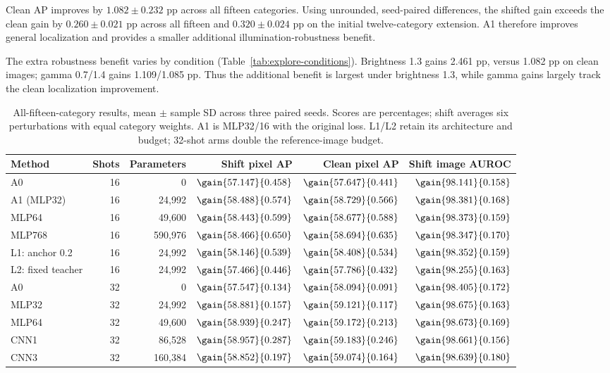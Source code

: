 Clean AP improves by $1.082\pm0.232$ pp across all fifteen categories. Using unrounded, seed-paired differences, the shifted gain exceeds the clean gain by $0.260\pm0.021$ pp across all fifteen and $0.320\pm0.024$ pp on the initial twelve-category extension. A1 therefore improves general localization and provides a smaller additional illumination-robustness benefit.

The extra robustness benefit varies by condition (Table~\ref{tab:explore-conditions}). Brightness 1.3 gains 2.461 pp, versus 1.082 pp on clean images; gamma 0.7/1.4 gains 1.109/1.085 pp. Thus the additional benefit is largest under brightness 1.3, while gamma gains largely track the clean localization improvement.

\begin{table}[t]
\centering
\caption{All-fifteen-category results, mean $\pm$ sample SD across three paired seeds. Scores are percentages; shift averages six perturbations with equal category weights. A1 is MLP32/16 with the original loss. L1/L2 retain its architecture and budget; 32-shot arms double the reference-image budget.}
\label{tab:all}
\setlength{\tabcolsep}{5pt}
\begin{tabular}{lrrrrr}\toprule
Method & Shots & Parameters & Shift pixel AP & Clean pixel AP & Shift image AUROC\\\midrule
A0 & 16 & 0 & $\gain{57.147}{0.458}$ & $\gain{57.647}{0.441}$ & $\gain{98.141}{0.158}$\\
A1 (MLP32) & 16 & 24,992 & $\gain{58.488}{0.574}$ & $\gain{58.729}{0.566}$ & $\gain{98.381}{0.168}$\\
MLP64 & 16 & 49,600 & $\gain{58.443}{0.599}$ & $\gain{58.677}{0.588}$ & $\gain{98.373}{0.159}$\\
MLP768 & 16 & 590,976 & $\gain{58.466}{0.650}$ & $\gain{58.694}{0.635}$ & $\gain{98.347}{0.170}$\\
L1: anchor 0.2 & 16 & 24,992 & $\gain{58.146}{0.539}$ & $\gain{58.408}{0.534}$ & $\gain{98.352}{0.159}$\\
L2: fixed teacher & 16 & 24,992 & $\gain{57.466}{0.446}$ & $\gain{57.786}{0.432}$ & $\gain{98.255}{0.163}$\\\midrule
A0 & 32 & 0 & $\gain{57.547}{0.134}$ & $\gain{58.094}{0.091}$ & $\gain{98.405}{0.172}$\\
MLP32 & 32 & 24,992 & $\gain{58.881}{0.157}$ & $\gain{59.121}{0.117}$ & $\gain{98.675}{0.163}$\\
MLP64 & 32 & 49,600 & $\gain{58.939}{0.247}$ & $\gain{59.172}{0.213}$ & $\gain{98.673}{0.169}$\\
CNN1 & 32 & 86,528 & $\gain{58.957}{0.287}$ & $\gain{59.183}{0.246}$ & $\gain{98.661}{0.156}$\\
CNN3 & 32 & 160,384 & $\gain{58.852}{0.197}$ & $\gain{59.074}{0.164}$ & $\gain{98.639}{0.180}$\\\bottomrule
\end{tabular}
\end{table}

